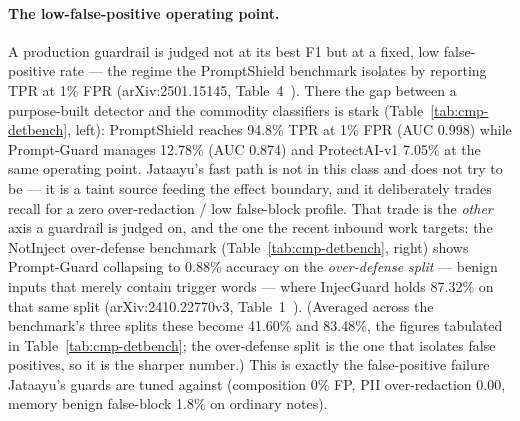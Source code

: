 \documentclass[11pt]{article}
\begin{document}
\paragraph{The low-false-positive operating point.} A production guardrail is judged not at its
best F1 but at a fixed, low false-positive rate --- the regime the PromptShield benchmark
isolates by reporting TPR at 1\% FPR (arXiv:2501.15145, Table~4~\cite{promptshield}). There the gap
between a purpose-built detector and the commodity classifiers is stark
(Table~\ref{tab:cmp-detbench}, left): PromptShield reaches 94.8\% TPR at 1\% FPR (AUC 0.998) while
Prompt-Guard manages 12.78\% (AUC 0.874) and ProtectAI-v1 7.05\% at the same operating point. Jataayu's fast path is not in this class and does not try to be
--- it is a taint source feeding the effect boundary, and it deliberately trades recall for a
zero over-redaction / low false-block profile. That trade is the \emph{other} axis a guardrail is
judged on, and the one the recent inbound work targets: the NotInject over-defense benchmark
(Table~\ref{tab:cmp-detbench}, right) shows Prompt-Guard collapsing to 0.88\% accuracy on the
\emph{over-defense split} --- benign inputs that merely contain trigger words --- where InjecGuard
holds 87.32\% on that same split (arXiv:2410.22770v3, Table~1~\cite{injecguard}). (Averaged across the benchmark's three splits
these become 41.60\% and 83.48\%, the figures tabulated in Table~\ref{tab:cmp-detbench}; the
over-defense split is the one that isolates false positives, so it is the sharper number.) This is
exactly the false-positive failure Jataayu's guards are tuned against (composition 0\% FP, PII
over-redaction 0.00, memory benign false-block 1.8\% on ordinary notes).
\end{document}
